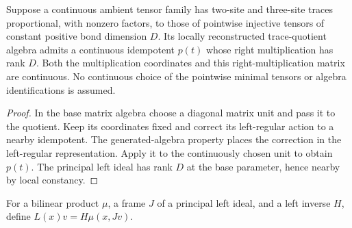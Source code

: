 \begin{lemma}
    \label{thm:spt_continuous_trace_quotient_primitive}
    \leanok
    Suppose a continuous ambient tensor family has two-site and three-site
    traces proportional, with nonzero factors, to those of pointwise
    injective tensors of constant positive bond dimension $D$.
    Its locally reconstructed trace-quotient algebra admits a continuous
    idempotent $p(t)$ whose right multiplication has rank $D$.
    Both the multiplication coordinates and this right-multiplication
    matrix are continuous. No continuous choice of the pointwise minimal
    tensors or algebra identifications is assumed.
\end{lemma}
\begin{proof}\leanok
    In the base matrix algebra choose a diagonal matrix unit and
    pass it to the quotient. Keep its coordinates fixed and
    correct its left-regular action to a nearby idempotent.
    The generated-algebra property places the correction in the
    left-regular representation. Apply it to the continuously chosen
    unit to obtain $p(t)$. The principal left ideal has rank $D$ at
    the base parameter, hence nearby by local constancy.
\end{proof}

\begin{definition}
    \label{def:spt_left_ideal_frame_action}
    \leanok
    For a bilinear product $\mu$, a frame $J$ of a principal left ideal,
    and a left inverse $H$, define $L(x)v=H\mu(x,Jv)$.
\end{definition}

